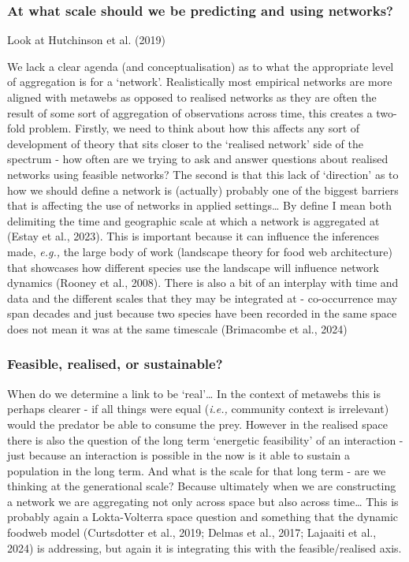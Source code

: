 \documentclass[
]{article}
\begin{document}
\subsubsection{At what scale should we be predicting and using
networks?}\label{at-what-scale-should-we-be-predicting-and-using-networks}

Look at Hutchinson et al. (2019)

We lack a clear agenda (and conceptualisation) as to what the
appropriate level of aggregation is for a `network'. Realistically most
empirical networks are more aligned with metawebs as opposed to realised
networks as they are often the result of some sort of aggregation of
observations across time, this creates a two-fold problem. Firstly, we
need to think about how this affects any sort of development of theory
that sits closer to the `realised network' side of the spectrum - how
often are we trying to ask and answer questions about realised networks
using feasible networks? The second is that this lack of `direction' as
to how we should define a network is (actually) probably one of the
biggest barriers that is affecting the use of networks in applied
settings\ldots{} By define I mean both delimiting the time and
geographic scale at which a network is aggregated at (Estay et al.,
2023). This is important because it can influence the inferences made,
\emph{e.g.,} the large body of work (landscape theory for food web
architecture) that showcases how different species use the landscape
will influence network dynamics (Rooney et al., 2008). There is also a
bit of an interplay with time and data and the different scales that
they may be integrated at - co-occurrence may span decades and just
because two species have been recorded in the same space does not mean
it was at the same timescale (Brimacombe et al., 2024)

\subsubsection{Feasible, realised, or
sustainable?}\label{feasible-realised-or-sustainable}

When do we determine a link to be `real'\ldots{} In the context of
metawebs this is perhaps clearer - if all things were equal
(\emph{i.e.,} community context is irrelevant) would the predator be
able to consume the prey. However in the realised space there is also
the question of the long term `energetic feasibility' of an interaction
- just because an interaction is possible in the now is it able to
sustain a population in the long term. And what is the scale for that
long term - are we thinking at the generational scale? Because
ultimately when we are constructing a network we are aggregating not
only across space but also across time\ldots{} This is probably again a
Lokta-Volterra space question and something that the dynamic foodweb
model (Curtsdotter et al., 2019; Delmas et al., 2017; Lajaaiti et al.,
2024) is addressing, but again it is integrating this with the
feasible/realised axis.
\end{document}
